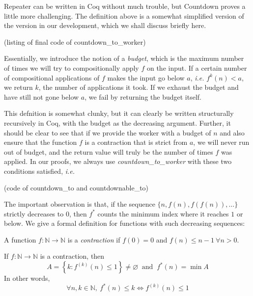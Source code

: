 Repeater can be written in Coq without much trouble, but Countdown
proves a little more challenging. The definition above is a somewhat
simplified version of the version in our development, which we shall
discuss briefly here. 

{\color{red}(listing of final code of countdown\_to\_worker)}

Essentially, we introduce the notion of a \textit{budget}, which is 
the maximum number of times we will try to compositionally 
apply $f$ on the input. If a certain number of compositional applications 
of $f$ makes the input go below $a$, \emph{i.e.} $f^{k}(n) < a$, 
we return $k$, the number of applications it took. If we exhaust the 
budget and have still not gone below $a$, 
we fail by returning the budget itself.

This defnition is somewhat clunky, but it can clearly be written
structurally recursively in Coq, with the budget as the decreasing
argument. Further, it should be clear to see that 
if we provide the worker with a budget of $n$ and also ensure that the 
function $f$ is a contraction that is strict from $a$, we will 
never run out of budget, and the return value will truly be the 
number of times $f$ was applied. In our proofs, we always use 
\textit{countdown\_to\_worker} with these two conditions satisfied, 
\emph{i.e.}

{\color{red}(code of countdown\_to and countdownable\_to)


\iffalse
The important observation is that, if the sequence 
$\{n, f(n), f(f(n)), \ldots\}$ strictly decreases to 
$0$, then $f^*$ counts the minimum index where it reaches 
$1$ or below. We give a formal definition for functions 
with such decreasing sequences:}

\begin{defn} \label{defn: contraction}
A function $f: \mathbb{N} \to \mathbb{N}$ is a \textit{contraction} if $f(0) = 0$ and $f(n) \le n-1 \ \forall n > 0$.
\end{defn}

\begin{thm} \label{thm: countdown contraction}
If $f: \mathbb{N} \to \mathbb{N}$ is a contraction, then
\begin{equation*}
A = \left\{k: f^{(k)}(n) \le 1\right\} \neq \varnothing \ \text{ and } \ f^*(n) = \min A
\end{equation*}
In other words,
\begin{equation*}
\forall n, k\in \mathbb{N}, \ f^*(n) \le k \iff f^{(k)}(n) \le 1
\end{equation*}
\end{thm}

